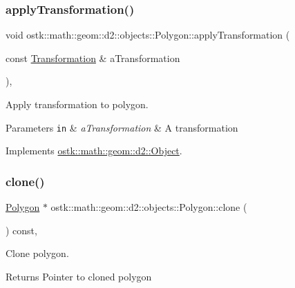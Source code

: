 \subsubsection{\texorpdfstring{apply\+Transformation()}{applyTransformation()}}
{\footnotesize\ttfamily void ostk\+::math\+::geom\+::d2\+::objects\+::\+Polygon\+::apply\+Transformation (\begin{DoxyParamCaption}\item[{const \hyperlink{classostk_1_1math_1_1geom_1_1d2_1_1_transformation}{Transformation} \&}]{a\+Transformation }\end{DoxyParamCaption})\hspace{0.3cm}{\ttfamily [override]}, {\ttfamily [virtual]}}



Apply transformation to polygon. 


\begin{DoxyParams}[1]{Parameters}
\mbox{\tt in}  & {\em a\+Transformation} & A transformation \\
\hline
\end{DoxyParams}


Implements \hyperlink{classostk_1_1math_1_1geom_1_1d2_1_1_object_a959e50211d7a680f7f904bbb752d75c9}{ostk\+::math\+::geom\+::d2\+::\+Object}.

\mbox{\label{classostk_1_1math_1_1geom_1_1d2_1_1objects_1_1_polygon_a55e4524d1f58bf8379580e63f49f0b48}} 
\subsubsection{\texorpdfstring{clone()}{clone()}}
{\footnotesize\ttfamily \hyperlink{classostk_1_1math_1_1geom_1_1d2_1_1objects_1_1_polygon}{Polygon} $\ast$ ostk\+::math\+::geom\+::d2\+::objects\+::\+Polygon\+::clone (\begin{DoxyParamCaption}{ }\end{DoxyParamCaption}) const\hspace{0.3cm}{\ttfamily [override]}, {\ttfamily [virtual]}}



Clone polygon. 

\begin{DoxyReturn}{Returns}
Pointer to cloned polygon 
\end{DoxyReturn}


